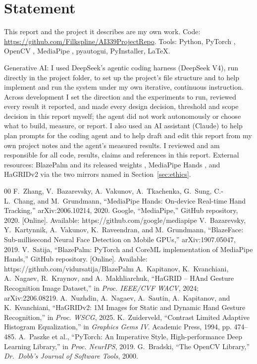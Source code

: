 \documentclass[conference,a4paper]{IEEEtran}
\begin{document}
\section*{Statement}
This report and the project it describes are my own work. Code:
\url{https://github.com/Filkspline/AI339ProjectRepo}. Tools: Python,
PyTorch \cite{pytorch}, OpenCV \cite{opencv}, MediaPipe \cite{mediapipe_github},
pyautogui, PyInstaller, \LaTeX.

Generative AI: I used DeepSeek's agentic coding harness (DeepSeek V4),
run directly in the project folder, to set up the project's file structure
and to help implement and run the system under my own iterative, continuous
instruction. Across development I set the direction and the experiments to
run, reviewed every result it reported, and made every design decision,
threshold and scope decision in this report myself; the agent did not work
autonomously or choose what to build, measure, or report. I also used an
AI assistant (Claude) to help plan prompts for the coding agent and to help
draft and edit this report from my own project notes and the agent's
measured results. I reviewed and am responsible for all code, results,
claims and references in this report. External resources: BlazePalm
\cite{blazepalm_port} and its released weights \cite{mediapipe_github},
MediaPipe Hands \cite{mediapipe}, and HaGRIDv2 \cite{hagrid2} via the two
mirrors named in Section~\ref{sec:ethics}.

\begin{thebibliography}{00}
 F.~Zhang, V.~Bazarevsky, A.~Vakunov, A.~Tkachenka,
G.~Sung, C.-L.~Chang, and M.~Grundmann, ``MediaPipe Hands: On-device
Real-time Hand Tracking,'' arXiv:2006.10214, 2020.
 Google, ``MediaPipe,'' GitHub repository, 2020.
[Online]. Available: https://github.com/google/mediapipe
 V.~Bazarevsky, Y.~Kartynnik, A.~Vakunov, K.~Raveendran,
and M.~Grundmann, ``BlazeFace: Sub-millisecond Neural Face Detection on
Mobile GPUs,'' arXiv:1907.05047, 2019.
 V.~Satija, ``BlazePalm: PyTorch and CoreML
implementation of MediaPipe Hands,'' GitHub repository. [Online].
Available: https://github.com/vidursatija/BlazePalm
 A.~Kapitanov, K.~Kvanchiani, A.~Nagaev, R.~Kraynov, and
A.~Makhliarchuk, ``HaGRID -- HAnd Gesture Recognition Image Dataset,'' in
\emph{Proc. IEEE/CVF WACV}, 2024; arXiv:2206.08219.
 A.~Nuzhdin, A.~Nagaev, A.~Sautin, A.~Kapitanov, and
K.~Kvanchiani, ``HaGRIDv2: 1M Images for Static and Dynamic Hand Gesture
Recognition,'' in \emph{Proc. WSCG}, 2025.
 K.~Zuiderveld, ``Contrast Limited Adaptive Histogram
Equalization,'' in \emph{Graphics Gems IV}. Academic Press, 1994, pp.
474--485.
 A.~Paszke et al., ``PyTorch: An Imperative Style,
High-performance Deep Learning Library,'' in \emph{Proc. NeurIPS}, 2019.
 G.~Bradski, ``The OpenCV Library,'' \emph{Dr.\ Dobb's
Journal of Software Tools}, 2000.
\end{thebibliography}
\end{document}
